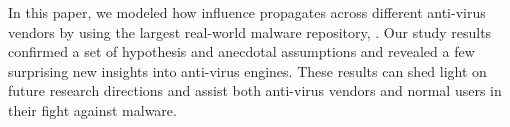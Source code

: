 In this paper, we modeled how influence propagates across different anti-virus 
vendors by using the largest real-world malware repository, \vt. 
Our study results confirmed a set of hypothesis and anecdotal assumptions
and revealed a few surprising new insights into anti-virus engines.
These results can shed light on future research directions
and assist both anti-virus vendors and normal users in their fight against malware.
